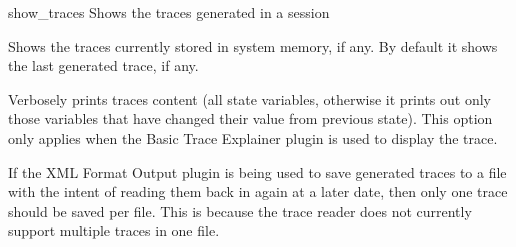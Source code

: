 \begin{nusmvCommand} {show\_traces} {Shows the traces generated in a \nusmvhead session}


Shows the traces currently stored in system memory, if any. By default
it shows the last generated trace, if any.

\begin{cmdOpt}
 { Verbosely prints traces content (all state variables,
otherwise it prints out only those variables that have changed their
value from previous state). This option only applies when the Basic
Trace Explainer plugin is used to display the trace.}






\end{cmdOpt}

If the XML Format Output plugin is being used to save generated traces
to a file with the intent of reading them back in again at a later
date, then only one trace should be saved per file. This is because
the trace reader does not currently support multiple traces in one
file.

\end{nusmvCommand}
